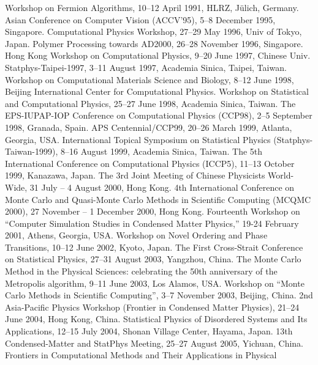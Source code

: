 
\bul Workshop on Fermion Algorithms, 10--12 April 1991,
        HLRZ, J\"ulich, Germany. 
\bul Asian Conference on Computer Vision (ACCV'95),
        5--8 December 1995, Singapore. 
\bul Computational Physics Workshop, 27--29 May 1996,
        Univ of Tokyo, Japan. 
\bul Polymer Processing towards AD2000, 
        26--28 November 1996, Singapore. 
\bul Hong Kong Workshop on Computational Physics, 9--20 June 1997,
            Chinese Univ.
\bul Statphys-Taipei-1997, 3--11 August 1997, Academia Sinica, Taipei,
            Taiwan.
\bul Workshop on Computational Materials Science and Biology,
        8--12 June 1998, Beijing International Center for 
        Computational Physics. 
\bul Workshop on Statistical and Computational Physics, 25--27 June 1998, 
     Academia Sinica, Taiwan.
\bul The EPS-IUPAP-IOP Conference on Computational
      Physics (CCP98), 2--5 September 1998, Granada, Spain.
\bul APS Centennial/CCP99, 20--26 March 1999, Atlanta, Georgia, USA.
\bul International Topical Symposium on Statistical Physics 
     (Statphys-Taiwan-1999), 8--16 August 1999, Academia Sinica, Taiwan. 
\bul The 5th International Conference on Computational Physics (ICCP5),
       11--13 October 1999, Kanazawa, Japan. 
\bul The 3rd Joint Meeting of Chinese Physicists World-Wide, 
     31 July -- 4 August 2000, Hong Kong. 
\bul 4th International Conference on Monte Carlo and Quasi-Monte Carlo
     Methods in Scientific Computing (MCQMC 2000), 27 November -- 
     1 December 2000, Hong Kong.
\bul Fourteenth Workshop on ``Computer Simulation Studies in Condensed
     Matter Physics,'' 19-24 February 2001, Athens, Georgia, USA.
\bul Workshop on Novel Ordering and Phase Transitions, 10--12 June 2002, 
     Kyoto, Japan.
\bul The First Cross-Strait Conference on Statistical Physics, 
     27--31 August 2003, Yangzhou, China.
\bul The Monte Carlo Method in the Physical Sciences: celebrating the 50th
     anniversary of the Metropolis algorithm, 9--11 June 2003,
     Los Alamos, USA.
\bul Workshop on ``Monte Carlo Methods in Scientific 
     Computing'', 3--7 November 2003, Beijing, China.
\bul 2nd Asia-Pacific Physics Workshop (Frontier in Condensed Matter Physics),
     21--24 June 2004, Hong Kong, China.
\bul Statistical Physics of Disordered Systems and Its Applications,
     12--15 July 2004, Shonan Village Center, Hayama, Japan.
\bul 13th Condensed-Matter and StatPhys Meeting, 25--27 August 2005, 
     Yichuan, China. 
\bul Frontiers in Computational Methods and Their Applications in Physical 
